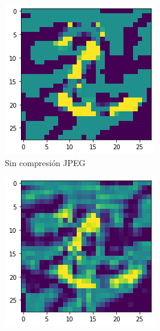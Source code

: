 \begin{figure}[h]
\centering
\begin{subfigure}[t]{0.22\textwidth}
\centering
    \includegraphics[width=\textwidth]{images/jpeg/fgsm_Le.png}
    \caption{Sin compresión JPEG}
    \label{fgsm_jpeg}
\end{subfigure}
\hspace{1em}
\begin{subfigure}[t]{0.22\textwidth}
\centering
    \includegraphics[width=\textwidth]{images/jpeg/fgsm_jpeg20_Le.png}

\end{subfigure}
\end{figure}

